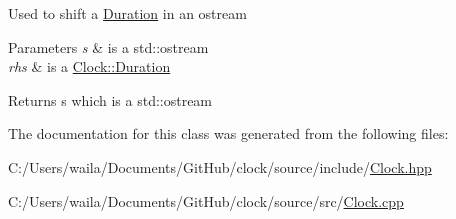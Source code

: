 Used to shift a \hyperlink{class_clock_1_1_duration}{Duration} in an ostream 
\begin{DoxyParams}{Parameters}
{\em s} & is a std\+::ostream \\
\hline
{\em rhs} & is a \hyperlink{class_clock_1_1_duration}{Clock\+::\+Duration} \\
\hline
\end{DoxyParams}
\begin{DoxyReturn}{Returns}
s which is a std\+::ostream 
\end{DoxyReturn}


The documentation for this class was generated from the following files\+:\begin{DoxyCompactItemize}
\item 
C\+:/\+Users/waila/\+Documents/\+Git\+Hub/clock/source/include/\hyperlink{_clock_8hpp}{Clock.\+hpp}\item 
C\+:/\+Users/waila/\+Documents/\+Git\+Hub/clock/source/src/\hyperlink{_clock_8cpp}{Clock.\+cpp}\end{DoxyCompactItemize}
